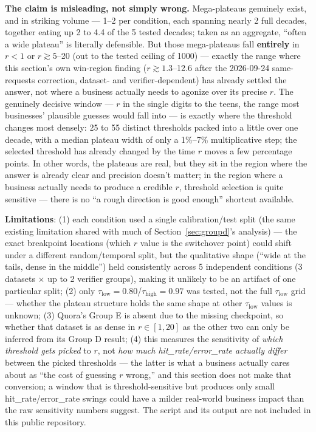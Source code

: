 \documentclass[11pt]{article}
\newcommand{\taulow}{\ensuremath{\tau_{\text{low}}}}
\newcommand{\tauhigh}{\ensuremath{\tau_{\text{high}}}}
\begin{document}
\textbf{The claim is misleading, not simply wrong.} Mega-plateaus genuinely exist, and in striking volume --- 1--2 per condition, each spanning nearly 2 full decades, together eating up 2 to 4.4 of the 5 tested decades; taken as an aggregate, ``often a wide plateau'' is literally defensible. But those mega-plateaus fall \textbf{entirely} in $r < 1$ or $r \gtrsim 5$--20 (out to the tested ceiling of 1000) --- exactly the range where this section's own win-region finding ($r\gtrsim1.3$--12.6 after the 2026-09-24 same-requests correction, dataset- and verifier-dependent) has already settled the answer, not where a business actually needs to agonize over its precise $r$. The genuinely decisive window --- $r$ in the single digits to the teens, the range most businesses' plausible guesses would fall into --- is exactly where the threshold changes most densely: 25 to 55 distinct thresholds packed into a little over one decade, with a median plateau width of only a 1\%--7\% multiplicative step; the selected threshold has already changed by the time $r$ moves a few percentage points. In other words, the plateaus are real, but they sit in the region where the answer is already clear and precision doesn't matter; in the region where a business actually needs to produce a credible $r$, threshold selection is quite sensitive --- there is no ``a rough direction is good enough'' shortcut available.

\textbf{Limitations}: (1) each condition used a single calibration/test split (the same existing limitation shared with much of Section~\ref{sec:groupd}'s analysis) --- the exact breakpoint locations (which $r$ value is the switchover point) could shift under a different random/temporal split, but the qualitative shape (``wide at the tails, dense in the middle'') held consistently across 5 independent conditions (3 datasets $\times$ up to 2 verifier groups), making it unlikely to be an artifact of one particular split; (2) only $\taulow=0.80$/$\tauhigh=0.97$ was tested, not the full $\taulow$ grid --- whether the plateau structure holds the same shape at other $\taulow$ values is unknown; (3) Quora's Group E is absent due to the missing checkpoint, so whether that dataset is as dense in $r\in[1,20]$ as the other two can only be inferred from its Group D result; (4) this measures the sensitivity of \emph{which threshold gets picked} to $r$, not \emph{how much hit\_rate/error\_rate actually differ} between the picked thresholds --- the latter is what a business actually cares about as ``the cost of guessing $r$ wrong,'' and this section does not make that conversion; a window that is threshold-sensitive but produces only small hit\_rate/error\_rate swings could have a milder real-world business impact than the raw sensitivity numbers suggest. The script and its output are not included in this public repository.
\end{document}
